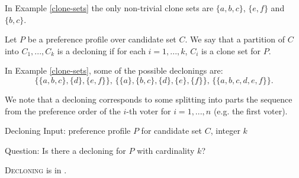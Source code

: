 \begin{exmp}
In Example \ref{clone-sets} the only non-trivial clone sets are
$\{a,b,c\}$, $\{e,f\}$ and $\{b,c\}$.
\end{exmp}

\begin{defn}[decloning]
Let $P$ be a preference profile over candidate set $C$.
We say that a partition of $C$ into $C_1, ..., C_k$ is a decloning
if for each $i=1,...,k$, $C_i$ is a clone set for $P$.
\end{defn}

\begin{exmp}
In Example \ref{clone-sets}, some of the possible declonings are:
$$
\big\{ \{a,b,c\}, \{d\}, \{e,f\} \big\} \text{, }
\big\{ \{a\}, \{b,c\}, \{d\}, \{e\}, \{f\} \big\} \text{, }
\big\{ \{a,b,c,d,e,f\} \big\} \text{.}
$$
\end{exmp}

\begin{rmrk} \label{sequence-split}
We note that a decloning corresponds to some splitting into parts
the sequence from the preference order of the $i$-th voter for $i=1,...,n$ (e.g. the first voter).
\end{rmrk}


\begin{problem}{Decloning}
    Input: preference profile $P$ for candidate set $C$, integer $k$

    Question: Is there a decloning for $P$ with cardinality $k$?
\end{problem}

\begin{thm}
\textsc{Decloning} is in \p.
\end{thm}

